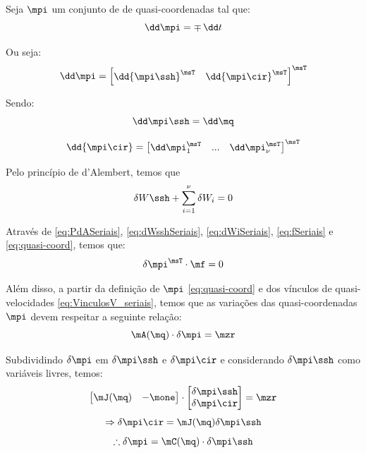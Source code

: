 \documentclass[]{politex}
\begin{document}
Seja $\mpi$ um conjunto de de quasi-coordenadas tal que:
\begin{equation} \label{eq:quasi-coord}
\dd \mpi = \mp \, \dd t
\end{equation}

Ou seja:
\begin{equation}
\dd\mpi = \begin{bmatrix}
\dd{\mpi\ssh}^\msT & \dd{\mpi\cir}^\msT
\end{bmatrix}^\msT
\end{equation}

Sendo:
\begin{equation}
\dd\mpi\ssh = \dd\mq
\end{equation}

\begin{equation}
\dd{\mpi\cir} = \begin{bmatrix}
\dd\mpi_1^\msT & ... & \dd\mpi_{\nu}^\msT
\end{bmatrix}^\msT
\end{equation}

Pelo princípio de d'Alembert, temos que
\begin{equation} \label{eq:PdASeriais}
\delta W\ssh + \sum_{i=1}^\nu \delta W_i  = 0
\end{equation}

Através de \eqref{eq:PdASeriais}, \eqref{eq:dWsshSeriais}, \eqref{eq:dWiSeriais}, \eqref{eq:fSeriais} e \eqref{eq:quasi-coord}, temos que:
\begin{equation} \label{eq:PdASeriais2}
\delta \mpi^\msT \cdot \mf = 0
\end{equation}


Além disso, a partir da definição de $\mpi$ \eqref{eq:quasi-coord} e dos vínculos de quasi-velocidades \eqref{eq:VinculosV_seriais}, temos que as variações das quasi-coordenadas $\mpi$ devem respeitar a seguinte relação:
\begin{equation} \label{eq:vinculosdpiSeriais}
 \mA(\mq) \cdot \delta \mpi = \mzr
\end{equation}


Subdividindo $\delta\mpi$ em $\delta\mpi\ssh $ e $\delta\mpi\cir$ e considerando $\delta\mpi\ssh$ como variáveis livres, temos:
\begin{equation}
\begin{bmatrix}
\mJ(\mq) & -\mone
\end{bmatrix}
\cdot
\begin{bmatrix}
\delta\mpi\ssh \\
\delta\mpi\cir
\end{bmatrix} = \mzr
\end{equation}
\begin{equation}
\Rightarrow \delta\mpi\cir = \mJ(\mq) \delta\mpi\ssh
\end{equation}
\begin{equation} \label{eq:dpidpisshSeriais}
\therefore
\delta\mpi = \mC(\mq) \cdot \delta\mpi\ssh
\end{equation}
\end{document}
